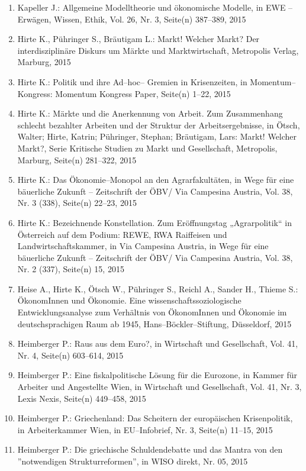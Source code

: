 \begin{enumerate}
	 \item Kapeller J.: Allgemeine Modelltheorie und ökonomische Modelle, in EWE -- Erwägen, Wissen, Ethik, Vol. 26, Nr. 3, Seite(n) 387--389, 2015
	 \item Hirte K., Pühringer S., Bräutigam L.: Markt! Welcher Markt? Der interdisziplinäre Diskurs um Märkte und Marktwirtschaft, Metropolis Verlag, Marburg, 2015
	 \item Hirte K.: Politik und ihre Ad--hoc-- Gremien in Krisenzeiten, in Momentum--Kongress: Momentum Kongress Paper, Seite(n) 1--22, 2015
	 \item Hirte K.: Märkte und die Anerkennung von Arbeit. Zum Zusammenhang schlecht bezahlter Arbeiten und der Struktur der Arbeitsergebnisse, in Ötsch, Walter; Hirte, Katrin; Pühringer, Stephan; Bräutigam, Lars: Markt! Welcher Markt?, Serie Kritische Studien zu Markt und Gesellschaft, Metropolis, Marburg, Seite(n) 281--322, 2015
	 \item Hirte K.: Das Ökonomie--Monopol an den Agrarfakultäten, in Wege für eine bäuerliche Zukunft – Zeitschrift der ÖBV/ Via Campesina Austria, Vol. 38, Nr. 3 (338), Seite(n) 22--23, 2015
	 \item Hirte K.: Bezeichnende Konstellation. Zum Eröffnungstag „Agrarpolitik“ in Österreich auf dem Podium: REWE, RWA Raiffeisen und Landwirtschaftskammer, in Via Campesina Austria, in Wege für eine bäuerliche Zukunft – Zeitschrift der ÖBV/ Via Campesina Austria, Vol. 38, Nr. 2 (337), Seite(n) 15, 2015
	 \item Heise A., Hirte K., Ötsch W., Pühringer S., Reichl A., Sander H., Thieme S.: ÖkonomInnen und Ökonomie. Eine wissenschaftssoziologische Entwicklungsanalyse zum Verhältnis von ÖkonomInnen und Ökonomie im deutschsprachigen Raum ab 1945, Hans--Böckler--Stiftung, Düsseldorf, 2015
	 \item Heimberger P.: Raus aus dem Euro?, in Wirtschaft und Gesellschaft, Vol. 41, Nr. 4, Seite(n) 603--614, 2015
	 \item Heimberger P.: Eine fiskalpolitische Lösung für die Eurozone, in Kammer für Arbeiter und Angestellte Wien, in Wirtschaft und Gesellschaft, Vol. 41, Nr. 3, Lexis Nexis, Seite(n) 449--458, 2015
	 \item Heimberger P.: Griechenland: Das Scheitern der europäischen Krisenpolitik, in Arbeiterkammer Wien, in EU--Infobrief, Nr. 3, Seite(n) 11--15, 2015
	 \item Heimberger P.: Die griechische Schuldendebatte und das Mantra von den ''notwendigen Strukturreformen'', in WISO direkt, Nr. 05, 2015

\end{enumerate}
